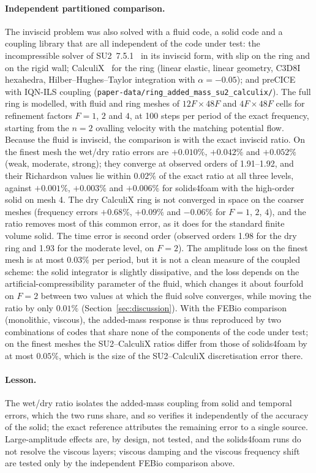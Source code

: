 \paragraph{Independent partitioned comparison.}
The inviscid problem was also solved with a fluid code, a solid code and a coupling library that are all independent of the code under test: the incompressible solver of SU2~7.5.1~\citep{Economon2016,Economon2020} in its inviscid form, with slip on the ring and on the rigid wall; CalculiX~\citep{Dhondt2004} for the ring (linear elastic, linear geometry, C3D8I hexahedra, Hilber--Hughes--Taylor integration with $\alpha = -0.05$); and preCICE with IQN-ILS coupling (\texttt{paper-data/ring\_added\_mass\_su2\_calculix/}).
The full ring is modelled, with fluid and ring meshes of $12F\times48F$ and $4F\times48F$ cells for refinement factors $F = 1$, $2$ and $4$, at 100 steps per period of the exact frequency, starting from the $n=2$ ovalling velocity with the matching potential flow.
Because the fluid is inviscid, the comparison is with the exact inviscid ratio.
On the finest mesh the wet/dry ratio errors are $+0.010\%$, $+0.042\%$ and $+0.052\%$ (weak, moderate, strong); they converge at observed orders of 1.91--1.92, and their Richardson values lie within $0.02\%$ of the exact ratio at all three levels, against $+0.001\%$, $+0.003\%$ and $+0.006\%$ for solids4foam with the high-order solid on mesh 4.
The dry CalculiX ring is not converged in space on the coarser meshes (frequency errors $+0.68\%$, $+0.09\%$ and $-0.06\%$ for $F = 1$, $2$, $4$), and the ratio removes most of this common error, as it does for the standard finite volume solid.
The time error is second order (observed orders 1.98 for the dry ring and 1.93 for the moderate level, on $F = 2$).
The amplitude loss on the finest mesh is at most $0.03\%$ per period, but it is not a clean measure of the coupled scheme: the solid integrator is slightly dissipative, and the loss depends on the artificial-compressibility parameter of the fluid, which changes it about fourfold on $F = 2$ between two values at which the fluid solve converges, while moving the ratio by only $0.01\%$ (Section~\ref{sec:discussion}).
With the FEBio comparison (monolithic, viscous), the added-mass response is thus reproduced by two combinations of codes that share none of the components of the code under test; on the finest meshes the SU2--CalculiX ratios differ from those of solids4foam by at most $0.05\%$, which is the size of the SU2--CalculiX discretisation error there.

\paragraph{Lesson.}
The wet/dry ratio isolates the added-mass coupling from solid and temporal errors, which the two runs share, and so verifies it independently of the accuracy of the solid; the exact reference attributes the remaining error to a single source.
Large-amplitude effects are, by design, not tested, and the solids4foam runs do not resolve the viscous layers; viscous damping and the viscous frequency shift are tested only by the independent FEBio comparison above.

